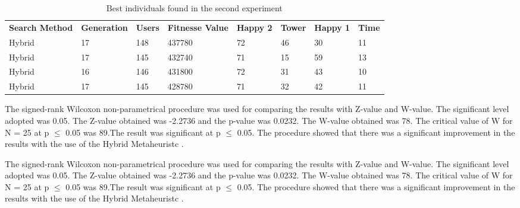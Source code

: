 \documentclass[times]{stvrauth}
\begin{document}
\begin{table}[h]
\centering
\caption{Best individuals found in the second experiment}
\label{tab:bestindividuals2}
\begin{tabular}{llllllll}
\rowcolor[HTML]{FFCCC9} 
\textbf{Search Method} & \textbf{Generation} & \textbf{Users} & \textbf{Fitnesse Value} & \textbf{Happy 2} & \textbf{Tower} & \textbf{Happy 1} & \textbf{Time} \\ 
\multicolumn{1}{l}{Hybrid} & \multicolumn{1}{l}{17} & \multicolumn{1}{l}{148} & \multicolumn{1}{l}{437780} & \multicolumn{1}{l}{72} & \multicolumn{1}{l}{46} & \multicolumn{1}{l}{30} & \multicolumn{1}{l}{11} \\ 
\multicolumn{1}{l}{Hybrid} & \multicolumn{1}{l}{17} & \multicolumn{1}{l}{145} & \multicolumn{1}{l}{432740} & \multicolumn{1}{l}{71} & \multicolumn{1}{l}{15} & \multicolumn{1}{l}{59} & \multicolumn{1}{l}{13} \\ 
\multicolumn{1}{l}{Hybrid} & \multicolumn{1}{l}{16} & \multicolumn{1}{l}{146} & \multicolumn{1}{l}{431800} & \multicolumn{1}{l}{72} & \multicolumn{1}{l}{31} & \multicolumn{1}{l}{43} & \multicolumn{1}{l}{10} \\ 
\multicolumn{1}{l}{Hybrid} & \multicolumn{1}{l}{17} & \multicolumn{1}{l}{145} & \multicolumn{1}{l}{428780} & \multicolumn{1}{l}{71} & \multicolumn{1}{l}{32} & \multicolumn{1}{l}{42} & \multicolumn{1}{l}{11} \\ 
\end{tabular}
\end{table}


The signed-rank Wilcoxon non-parametrical procedure was used for comparing the results with Z-value and W-value. The significant level adopted was 0.05. The Z-value obtained was -2.2736 and the p-value was 0.0232. The W-value obtained was 78. The critical value of W for N = 25 at p $\leq$ 0.05 was 89.The result was significant at p $\leq$ 0.05. The procedure showed that there was a significant improvement in the results with the use of the Hybrid Metaheuristc .

The signed-rank Wilcoxon non-parametrical procedure was used for comparing the results with Z-value and W-value. The significant level adopted was 0.05. The Z-value obtained was -2.2736 and the p-value was 0.0232. The W-value obtained was 78. The critical value of W for N = 25 at p $\leq$ 0.05 was 89.The result was significant at p $\leq$ 0.05. The procedure showed that there was a significant improvement in the results with the use of the Hybrid Metaheuristc .
\end{document}
